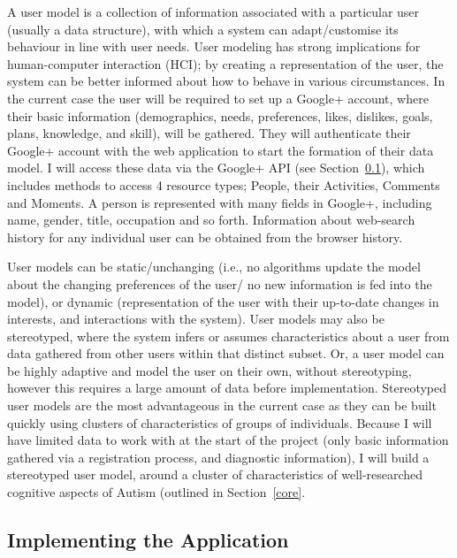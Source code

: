 \documentclass[a4paper, 10pt]{article}
\begin{document}
A user model is a collection of information associated with a particular user (usually a data structure), with which a system can adapt/customise its behaviour in line with user needs. User modeling has strong implications for human-computer interaction (HCI); by creating a representation of the user, the system can be better informed about how to behave in various circumstances. In the current case the user will be required to set up a Google+ account, where their basic information (demographics, needs, preferences, likes, dislikes, goals, plans, knowledge, and skill), will be gathered. They will authenticate their Google+ account with the web application to start the formation of their data model. I will access these data via the Google+ API (see Section~\ref{api}), which includes methods to access 4 resource  types; People, their Activities, Comments and Moments. A person is represented with many fields in Google+, including name, gender, title, occupation and so forth. Information about web-search history for any individual user can be obtained from the browser history. 

User models can be static/unchanging (i.e., no algorithms update the model about the changing preferences of the user/ no new information is fed into the model), or dynamic (representation of the user with their up-to-date changes in interests, and interactions with the system). User models may also be stereotyped, where the system infers or assumes characteristics about a user from data gathered from other users within that distinct subset. Or, a user model can be highly adaptive and model the user on their own, without stereotyping, however this requires a large amount of data before implementation. Stereotyped user models are the most advantageous in the current case as they can be built quickly using clusters of characteristics of groups of individuals. Because I will have limited data to work with at the start of the project (only basic information gathered via a registration process, and diagnostic information), I will build a stereotyped user model, around a cluster of characteristics of well-researched cognitive aspects of Autism (outlined in Section~\ref{core}.

\subsection{Implementing the Application}\label{api}
\end{document}
